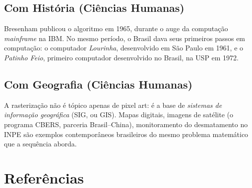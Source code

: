 \documentclass[12pt,a4paper]{scrartcl}
\begin{document}
\subsection{Com História (Ciências Humanas)}
Bresenham publicou o algoritmo em 1965, durante o auge da computação \emph{mainframe} na IBM. No mesmo período, o Brasil dava seus primeiros passos em computação: o computador \emph{Lourinha}, desenvolvido em São Paulo em 1961, e o \emph{Patinho Feio}, primeiro computador desenvolvido no Brasil, na USP em 1972.

\subsection{Com Geografia (Ciências Humanas)}
A rasterização não é tópico apenas de pixel art: é a base de \emph{sistemas de informação geográfica} (SIG, ou GIS). Mapas digitais, imagens de satélite (o programa CBERS, parceria Brasil--China), monitoramento do desmatamento no INPE são exemplos contemporâneos brasileiros do mesmo problema matemático que a sequência aborda.

\section{Referências}\label{sec:referencias}
\end{document}
